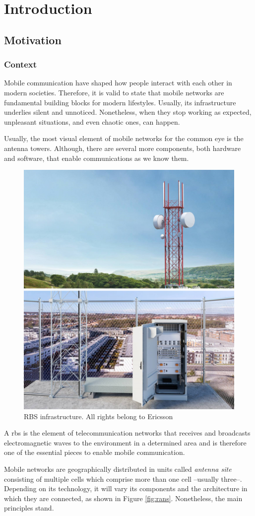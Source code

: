 
\chapter{Introduction}
\label{cha:introduction}

\section{Motivation}

\subsection{Context}

Mobile communication have shaped how people interact with each other in modern societies. Therefore, it is valid to state that mobile networks are fundamental building blocks for modern lifestyles. Usually, its infrastructure underlies silent and unnoticed. Nonetheless, when they stop working as expected, unpleasant situations, and even chaotic ones, can happen.

Usually, the most visual element of mobile networks for the common eye is the antenna towers. Although, there are several more components, both hardware and software, that enable communications as we know them.      

\begin{figure}[H]
	\centering
	\includegraphics[width=0.42\linewidth]{figures/RBS_insfrastucture.png}
	\caption[RBS infrastructure]{RBS infrastructure. All rights belong to Ericsson}
	\label{fig:rbs_infrastucture}
\end{figure}

A \ac{rbs} is the element of telecommunication networks that receives and broadcasts electromagnetic waves to the environment in a determined area and is therefore one of the essential pieces to enable mobile communication. 

Mobile networks are geographically distributed in units called \emph{antenna site} consisting of multiple cells which comprise more than one cell --usually three--. Depending on its technology, it will vary its components and the architecture in which they are connected, as shown in Figure \ref{fig:rans}. Nonetheless, the main principles stand. 

